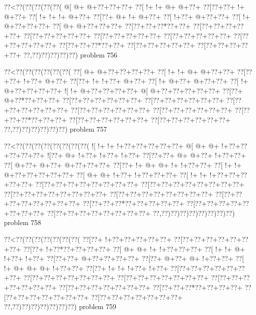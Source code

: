 \vbox{\vbox{\goo
\0??<\0??(\0??(\0??(\0??(\0??(
\- @[\- @+\- @+\0??+\0??+\0??+
\0??[\- !+\- !+\- @+\- @+\0??+
\0??[\0??+\0??+\- !+\- @+\0??+
\0??[\- !+\- !+\- !+\- @+\0??+
\0??[\0??+\- @+\- !+\- @+\0??+
\0??[\- !+\0??+\- @+\0??+\0??+
\0??[\- !+\- @+\0??+\0??+\0??+
\0??[\- @+\- @+\0??+\0??+\0??+
\0??[\0??+\0??+\0??*\0??+\0??+
\0??[\0??+\0??+\0??+\0??+\0??+
\0??[\0??+\0??+\0??+\0??+\0??+
\0??[\0??+\0??+\0??+\0??+\0??+
\0??[\0??+\0??+\0??+\0??+\0??+
\0??[\0??+\0??+\0??+\0??+\0??+
\0??[\0??+\0??+\0??*\0??+\0??+
\0??[\0??+\0??+\0??+\0??+\0??+
\0??[\0??+\0??+\0??+\0??+\0??+
\0??,\0??)\0??)\0??)\0??)\0??)
}
\hfil problem 756\hfil\break
}

\vbox{\vbox{\goo
\0??<\0??(\0??(\0??(\0??(\0??(\0??(
\0??[\- @+\- @+\0??+\0??+\0??+\0??+
\0??[\- !+\- !+\- @+\- @+\0??+\0??+
\0??[\0??+\0??+\- !+\0??+\- @+\0??+
\0??[\0??+\- !+\- !+\0??+\- @+\0??+
\0??[\- !+\- @+\0??+\- @+\0??+\0??+
\0??[\- !+\- @+\0??+\0??+\0??+\0??+
\- ![\- !+\- @+\0??+\0??+\0??+\0??+
\- @[\- @+\0??+\0??+\0??+\0??+\0??+
\0??[\0??+\- @+\0??*\0??+\0??+\0??+
\0??[\0??+\0??+\0??+\0??+\0??+\0??+
\0??[\0??+\0??+\0??+\0??+\0??+\0??+
\0??[\0??+\0??+\0??+\0??+\0??+\0??+
\0??[\0??+\0??+\0??+\0??+\0??+\0??+
\0??[\0??+\0??+\0??+\0??+\0??+\0??+
\0??[\0??+\0??+\0??*\0??+\0??+\0??+
\0??[\0??+\0??+\0??+\0??+\0??+\0??+
\0??[\0??+\0??+\0??+\0??+\0??+\0??+
\0??,\0??)\0??)\0??)\0??)\0??)\0??)
}
\hfil problem 757\hfil\break
}

\vbox{\vbox{\goo
\0??<\0??(\0??(\0??(\0??(\0??(\0??(\0??(\0??(
\- ![\- !+\- !+\- !+\0??+\0??+\0??+\0??+\0??+
\- @[\- @+\- @+\- !+\0??+\0??+\0??+\0??+\0??+
\- ![\0??+\- @+\- !+\0??+\- !+\0??+\- !+\0??+
\0??[\0??+\0??+\- @+\- @+\0??+\- !+\0??+\0??+
\0??[\- @+\0??+\- @+\0??+\- @+\0??+\0??+\0??+
\0??[\0??+\- !+\- @+\- @+\- !+\- !+\0??+\0??+
\0??[\- !+\- !+\- @+\0??+\0??+\0??+\0??+\0??+
\0??[\- @+\- @+\- !+\0??+\- !+\0??+\0??+\0??+
\0??[\- !+\- !+\- !+\0??+\0??+\0??+\0??+\0??+
\0??[\0??+\0??+\0??+\0??+\0??+\0??+\0??+\0??+
\0??[\0??+\0??+\0??+\0??+\0??+\0??+\0??+\0??+
\0??[\0??+\0??+\0??+\0??+\0??+\0??+\0??+\0??+
\0??[\0??+\0??+\0??+\0??+\0??+\0??+\0??+\0??+
\0??[\0??+\0??+\0??+\0??+\0??+\0??+\0??+\0??+
\0??[\0??+\0??+\0??*\0??+\0??+\0??+\0??+\0??+
\0??[\0??+\0??+\0??+\0??+\0??+\0??+\0??+\0??+
\0??[\0??+\0??+\0??+\0??+\0??+\0??+\0??+\0??+
\0??,\0??)\0??)\0??)\0??)\0??)\0??)\0??)\0??)
}
\hfil problem 758\hfil\break
}

\vbox{\vbox{\goo
\0??<\0??(\0??(\0??(\0??(\0??(\0??(\0??(
\0??[\0??+\- !+\0??+\0??+\0??+\0??+\0??+
\0??[\0??+\0??+\0??+\0??+\0??+\0??+\0??+
\0??[\0??+\- !+\0??*\0??+\0??+\0??+\0??+
\0??[\- @+\- @+\- !+\- !+\0??+\0??+\0??+
\0??[\- !+\- !+\- @+\- !+\0??+\- !+\0??+
\0??[\0??+\0??+\- @+\0??+\0??+\0??+\0??+
\0??[\0??+\- @+\0??+\- @+\- !+\0??+\0??+
\0??[\- !+\- @+\- @+\- @+\- !+\0??+\0??+
\0??[\0??+\- !+\- !+\- !+\0??+\- !+\0??+
\0??[\0??+\0??+\0??+\0??+\0??+\0??+\0??+
\0??[\0??+\0??+\0??+\0??+\0??+\0??+\0??+
\0??[\0??+\0??+\0??+\0??+\0??+\0??+\0??+
\0??[\0??+\0??+\0??+\0??+\0??+\0??+\0??+
\0??[\0??+\0??+\0??+\0??+\0??+\0??+\0??+
\0??[\0??+\0??+\0??*\0??+\0??+\0??+\0??+
\0??[\0??+\0??+\0??+\0??+\0??+\0??+\0??+
\0??[\0??+\0??+\0??+\0??+\0??+\0??+\0??+
\0??,\0??)\0??)\0??)\0??)\0??)\0??)\0??)
}
\hfil problem 759\hfil\break
}


